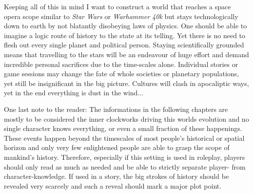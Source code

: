 Keeping all of this in mind I want to construct a world that reaches a space
opera scope similar to \textit{Star Wars} or \textit{Warhammer 40k} but stays
technologically down to earth by not blatantly disobeying laws of physics. One
should be able to imagine a logic route of history to the
state at its telling. Yet there is no need to flesh out every single planet and
political person. Staying scientifically grounded means that travelling to the
stars will be an endeavour of huge effort and demand incredible personal
sacrifices due to the time-scales alone. Individual stories or game sessions may
change the fate of whole societies or planetary populations, yet still be
insignificant in the big picture. Cultures will clash in apocaliptic ways, yet
in the end everything is dust in the wind...

One last note to the reader: The informations in the following chapters are
mostly to be considered the inner clockworks driving this worlds evolution and
no single character knows everything, or even a small fraction of these
happenings. These events happen beyond the timescales of most people's
historical or spatial horizon and only very few enlightened people are able to
grasp the scope of mankind's history. Therefore, especially if this setting is
used in roleplay, players should only read as much as needed and be able to
strictly separate player- from character-knowledge. If used in a story, the
big strokes of history should be revealed very scarcely and such a reveal should
mark a major plot point.
